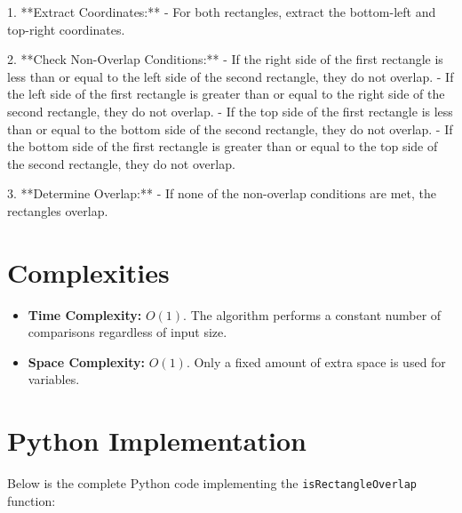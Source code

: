 1. **Extract Coordinates:**
   - For both rectangles, extract the bottom-left and top-right coordinates.

2. **Check Non-Overlap Conditions:**
   - If the right side of the first rectangle is less than or equal to the left side of the second rectangle, they do not overlap.
   - If the left side of the first rectangle is greater than or equal to the right side of the second rectangle, they do not overlap.
   - If the top side of the first rectangle is less than or equal to the bottom side of the second rectangle, they do not overlap.
   - If the bottom side of the first rectangle is greater than or equal to the top side of the second rectangle, they do not overlap.

3. **Determine Overlap:**
   - If none of the non-overlap conditions are met, the rectangles overlap.


\section*{Complexities}

\begin{itemize}
    \item \textbf{Time Complexity:} \(O(1)\). The algorithm performs a constant number of comparisons regardless of input size.
    
    \item \textbf{Space Complexity:} \(O(1)\). Only a fixed amount of extra space is used for variables.
\end{itemize}

\section*{Python Implementation}


Below is the complete Python code implementing the \texttt{isRectangleOverlap} function:

